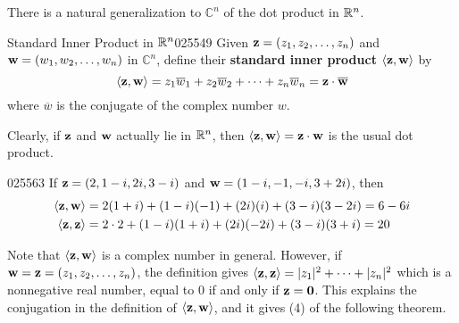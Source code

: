 There is a natural generalization to $\mathbb{C}^n$ of the dot product in $\mathbb{R}^n$.


\begin{definition}{Standard Inner Product in $\mathbb{R}^n$}{025549}
Given $\textbf{z} = (z_{1}, z_{2}, \dots, z_{n})$ and $\textbf{w} = (w_{1}, w_{2}, \dots, w_{n})$ in $\mathbb{C}^n$, define their \textbf{standard inner product} $\langle \textbf{z}, \textbf{w} \rangle$ by
\begin{equation*}
\langle \textbf{z}, \textbf{w} \rangle = z_{1}\overline{w}_{1} + z_{2}\overline{w}_{2} + \dots + z_{n}\overline{w}_{n} = \textbf{z} \cdot \overline{\textbf{w}}
\end{equation*}
where $\overline{w}$ is the conjugate of the complex number $w$.
\end{definition}

\noindent Clearly, if $\textbf{z}$ and $\textbf{w}$ actually lie in $\mathbb{R}^n$, then $\langle \textbf{z}, \textbf{w} \rangle = \textbf{z} \cdot \textbf{w}$ is the usual dot product.


\begin{example}{}{025563}
If $\textbf{z} = (2, 1 - i, 2i, 3 - i)$ and $\textbf{w} = (1 - i, -1, -i, 3 + 2i)$, then
\begin{align*}
\langle \textbf{z}, \textbf{w} \rangle &= 2(1 + i) + (1 - i)(-1) + (2i)(i) + (3 - i)(3 - 2i) = 6 -6i \\
\langle \textbf{z}, \textbf{z} \rangle &= 2 \cdot 2 + (1 - i)(1 + i) + (2i)(-2i) + (3 - i)(3 + i) = 20
\end{align*}
\end{example}

Note that $\langle \textbf{z}, \textbf{w} \rangle$ is a complex number in general. However, if $\textbf{w} = \textbf{z} = (z_{1}, z_{2}, \dots, z_{n})$, the definition gives $\langle \textbf{z}, \textbf{z} \rangle = |z_{1}|^{2} + \dots  + |z_{n}|^{2}$ which is a nonnegative real number, equal to $0$ if and only if $\textbf{z} = \textbf{0}$. This explains the conjugation in the definition of $\langle \textbf{z}, \textbf{w} \rangle$, and it gives (4) of the following theorem.



